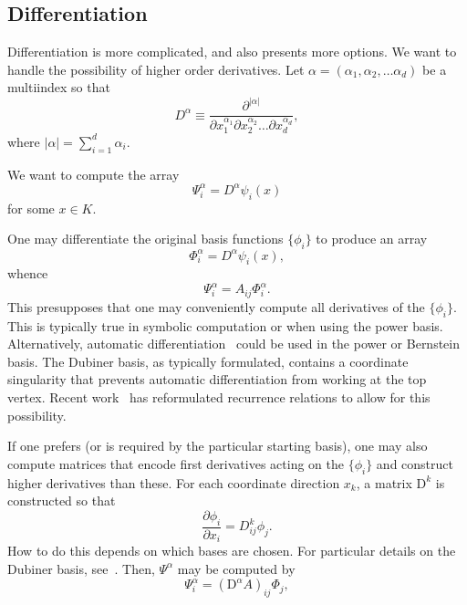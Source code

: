 \subsection{Differentiation}
Differentiation is more complicated, and also presents more options.
We want to handle the possibility of higher order derivatives. Let
\( \alpha = ( \alpha_1 , \alpha_2 , \dots \alpha_d ) \) be a
multiindex so that
\[
D^\alpha \equiv \frac{\partial^{|\alpha|}}{\partial
  x_1^{\alpha_1} \partial x_2^{\alpha_2} \dots \partial x_d^{\alpha_d}},
\]
where \( |\alpha| = \sum_{i=1}^{d} \alpha_i \).

We want to compute the array
\[
\Psi^\alpha_i = D^\alpha \psi_i(x)
\]
for some \( x \in K \).

One may differentiate the
original basis functions \( \{ \phi_i \} \) to produce an array
\[
\Phi^\alpha_i = D^\alpha \psi_i(x),
\]
whence
\[
\Psi^\alpha_i = A_{ij} \Phi^\alpha_i.
\]
This presupposes that one may conveniently compute all derivatives of
the \( \{ \phi_i \} \).  This is typically true in symbolic
computation or when using the power basis.  Alternatively, automatic
differentiation~\cite{missing} could be used in the power or Bernstein basis.
The Dubiner basis, as typically formulated, contains a coordinate
singularity that prevents automatic differentiation from working at
the top vertex.  Recent work~\cite{missing} has reformulated recurrence
relations to allow for this possibility.

If one prefers (or is required by the particular starting basis), one
may also compute matrices that encode first derivatives acting on the
\( \{ \phi_i \} \) and construct higher derivatives than these.
For each coordinate direction \( x_k \), a matrix \( \mathrm{D}^k \)
is constructed so that
\[
\frac{\partial \phi_i}{\partial x_i} =
D^k_{ij} \phi_j.
\]
How to do this depends on which bases are chosen.  For particular
details on the Dubiner basis, see~\cite{missing}.  Then, \( \Psi^\alpha \)
may be computed by
\[
\Psi^\alpha_i = (\mathrm{D}^\alpha A)_{ij} \Phi_{j},
\]

